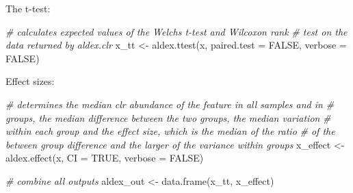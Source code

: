 \documentclass[
]{book}
\newenvironment{Shaded}{\begin{snugshade}}{\end{snugshade}}
\newcommand{\AttributeTok}[1]{\textcolor[rgb]{0.77,0.63,0.00}{#1}}
\newcommand{\CommentTok}[1]{\textcolor[rgb]{0.56,0.35,0.01}{\textit{#1}}}
\newcommand{\ConstantTok}[1]{\textcolor[rgb]{0.00,0.00,0.00}{#1}}
\newcommand{\DecValTok}[1]{\textcolor[rgb]{0.00,0.00,0.81}{#1}}
\newcommand{\FunctionTok}[1]{\textcolor[rgb]{0.00,0.00,0.00}{#1}}
\newcommand{\NormalTok}[1]{#1}
\newcommand{\OtherTok}[1]{\textcolor[rgb]{0.56,0.35,0.01}{#1}}
\newcommand{\SpecialCharTok}[1]{\textcolor[rgb]{0.00,0.00,0.00}{#1}}
\begin{document}
\begin{Shaded}
\end{Shaded}

The t-test:

\begin{Shaded}
\begin{Highlighting}[]
\CommentTok{\# calculates expected values of the Welch\textquotesingle{}s t{-}test and Wilcoxon rank}
\CommentTok{\# test on the data returned by aldex.clr}
\NormalTok{x\_tt }\OtherTok{\textless{}{-}} \FunctionTok{aldex.ttest}\NormalTok{(x, }\AttributeTok{paired.test =} \ConstantTok{FALSE}\NormalTok{, }\AttributeTok{verbose =} \ConstantTok{FALSE}\NormalTok{)}
\end{Highlighting}
\end{Shaded}

Effect sizes:

\begin{Shaded}
\begin{Highlighting}[]
\CommentTok{\# determines the median clr abundance of the feature in all samples and in}
\CommentTok{\# groups, the median difference between the two groups, the median variation}
\CommentTok{\# within each group and the effect size, which is the median of the ratio}
\CommentTok{\# of the between group difference and the larger of the variance within groups}
\NormalTok{x\_effect }\OtherTok{\textless{}{-}} \FunctionTok{aldex.effect}\NormalTok{(x, }\AttributeTok{CI =} \ConstantTok{TRUE}\NormalTok{, }\AttributeTok{verbose =} \ConstantTok{FALSE}\NormalTok{)}

\CommentTok{\# combine all outputs }
\NormalTok{aldex\_out }\OtherTok{\textless{}{-}} \FunctionTok{data.frame}\NormalTok{(x\_tt, x\_effect)}
\end{Highlighting}
\end{Shaded}
\end{document}
